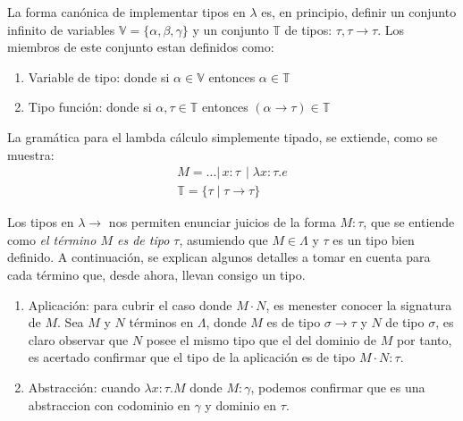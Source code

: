 La forma canónica de implementar tipos en $\lambda$ es, en principio, definir un conjunto infinito de variables $\mathbb{V} = \{\alpha, \beta, \gamma\}$ y un conjunto $\mathbb{T}$ de tipos: $\tau, \tau \to \tau$. Los miembros de este conjunto estan definidos como:
\begin{enumerate}
        \item Variable de tipo: donde si $\alpha \in \mathbb{V}$ entonces $\alpha \in \mathbb{T}$
        \item Tipo función: donde si $\alpha, \tau \in \mathbb{T}$ entonces $(\alpha \to \tau) \in \mathbb{T}$
\end{enumerate}
 
La gramática para el lambda cálculo simplemente tipado, se extiende, como se muestra:
    \begin{align*}
      M = \ldots |\, x : \tau \, \mid \lambda x : \tau . e \\
      \mathbb{T} = \{\tau \mid \tau \to \tau\}\
    \end{align*}

  Los tipos en $\lambda\to$ nos permiten enunciar juicios de la forma $M : \tau$, que se entiende como \textit{el término $M$ es de tipo $\tau$}, asumiendo que $M \in \Lambda$ y $\tau$ es un tipo bien definido. A continuación, se explican algunos detalles a tomar en cuenta para cada término que, desde ahora, llevan consigo un tipo.

  \begin{enumerate}
    \item Aplicación: para cubrir el caso donde $M \cdot N$, es menester conocer la signatura de $M$. Sea $M$ y $N$ términos en $\Lambda$, donde $M$ es de tipo $\sigma  \to \tau$ y $N$ de tipo $\sigma$, es claro observar que $N$ posee el mismo tipo que el del dominio de $M$ por tanto, es acertado confirmar que el tipo de la aplicación es de tipo $M \cdot N : \tau $.
    \item Abstracción: cuando $\lambda x : \tau . M$ donde $M : \gamma$, podemos confirmar que es una abstraccion con codominio en $\gamma$ y dominio en $\tau$.
          \end{enumerate}

